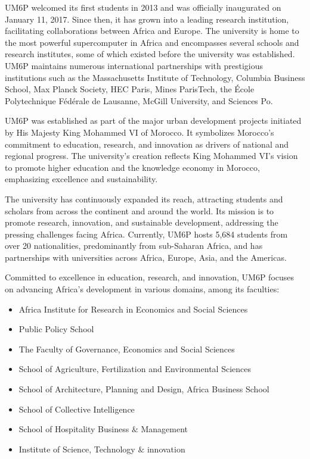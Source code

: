 UM6P welcomed its first students in 2013 and was officially inaugurated on January 11, 2017. Since then, it has grown into a leading research institution, facilitating collaborations between Africa and Europe. The university is home to the most powerful supercomputer in Africa and encompasses several schools and research institutes, some of which existed before the university was established. UM6P maintains numerous international partnerships with prestigious institutions such as the Massachusetts Institute of Technology, Columbia Business School, Max Planck Society, HEC Paris, Mines ParisTech, the École Polytechnique Fédérale de Lausanne, McGill University, and Sciences Po.


UM6P was established as part of the major urban development projects initiated by His Majesty King Mohammed VI of Morocco. It symbolizes Morocco's commitment to education, research, and innovation as drivers of national and regional progress. The university's creation reflects King Mohammed VI's vision to promote higher education and the knowledge economy in Morocco, emphasizing excellence and sustainability.

The university has continuously expanded its reach, attracting students and scholars from across the continent and around the world. Its mission is to promote research, innovation, and sustainable development, addressing the pressing challenges facing Africa. Currently, UM6P hosts 5,684 students from over 20 nationalities, predominantly from sub-Saharan Africa, and has partnerships with universities across Africa, Europe, Asia, and the Americas.



Committed to excellence in education, research, and innovation, UM6P focuses on advancing Africa's development in various domains, among its faculties: 
\begin{itemize}
    \item Africa Institute for Research in Economics and Social Sciences
    \item Public Policy School
    \item The Faculty of Governance, Economics and Social Sciences
    \item School of Agriculture, Fertilization and Environmental Sciences
    \item School of Architecture, Planning and Design, Africa Business School
    \item School of Collective Intelligence
    \item School of Hospitality Business $\&$ Management
    \item Institute of Science, Technology $\&$ innovation


\end{itemize}


